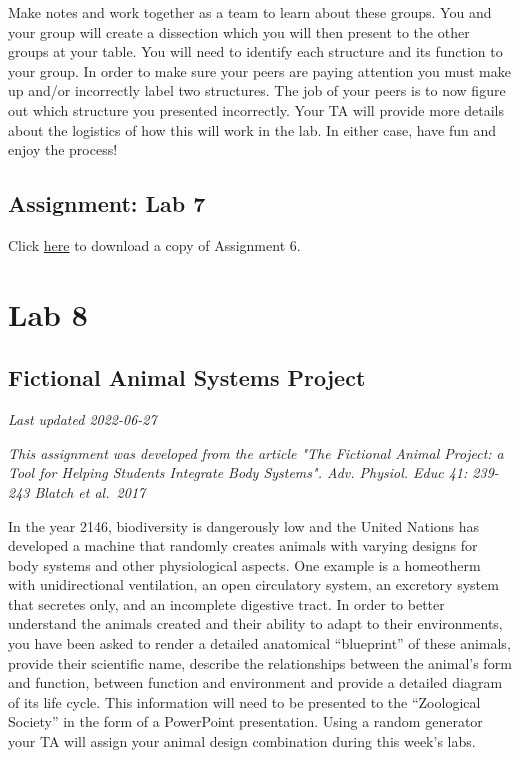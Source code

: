 \documentclass[
]{book}
\begin{document}
Make notes and work together as a team to learn about these groups. You and your group will create a dissection which you will then present to the other groups at your table. You will need to identify each structure and its function to your group. In order to make sure your peers are paying attention you must make up and/or incorrectly label two structures. The job of your peers is to now figure out which structure you presented incorrectly. Your TA will provide more details about the logistics of how this will work in the lab. In either case, have fun and enjoy the process!

\hypertarget{assignment-lab-7}{%
\chapter*{Assignment: Lab 7}\label{assignment-lab-7}}

Click \href{files/Lab6_Assignment.pdf}{here} to download a copy of Assignment 6.

\hypertarget{part-lab-8}{%
\part*{Lab 8}\label{part-lab-8}}

\hypertarget{fictional-animal-systems-project}{%
\chapter*{Fictional Animal Systems Project}\label{fictional-animal-systems-project}}

\emph{Last updated 2022-06-27}

\emph{This assignment was developed from the article "The Fictional Animal Project: a Tool for Helping Students Integrate Body Systems". Adv. Physiol. Educ 41: 239-243 Blatch et al.~2017}

In the year 2146, biodiversity is dangerously low and the United Nations has developed a machine that randomly creates animals with varying designs for body systems and other physiological aspects. One example is a homeotherm with unidirectional ventilation, an open circulatory system, an excretory system that secretes only, and an incomplete digestive tract. In order to better understand the animals created and their ability to adapt to their environments, you have been asked to render a detailed anatomical ``blueprint'' of these animals, provide their scientific name, describe the relationships between the animal's form and function, between function and environment and provide a detailed diagram of its life cycle. This information will need to be presented to the ``Zoological Society'' in the form of a PowerPoint presentation. Using a random generator your TA will assign your animal design combination during this week's labs.
\end{document}
